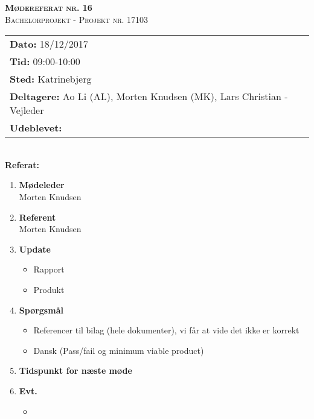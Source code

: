 
\newcommand{\HRule}{\rule{\linewidth}{0.1mm}}


	\begin{center}
		{\huge \bfseries \textsc{Mødereferat nr. 16}}\\
		\textsc{\large Bachelorprojekt - Projekt nr. 17103}\\[0.3cm]
	\end{center}
	\begin{tabular}{ll}
	\large \textbf{Dato:} 18/12/2017  	\\ %
	\large \textbf{Tid:}  09:00-10:00 	\\ %
	\large \textbf{Sted:} Katrinebjerg		\\ %
	\large \textbf{Deltagere:} Ao Li (AL), Morten Knudsen (MK), Lars Christian - Vejleder \\
	\large \textbf{Udeblevet:} 
	\end{tabular}\\
	\phantom{\,}\hspace{0.1em} \large \textbf{Referat:}
	\begin{enumerate}
		\itemsep 0.3em 
		\item \textbf{Mødeleder}\\
			Morten Knudsen
		\item \textbf{Referent}\\
			Morten Knudsen

		\item \textbf{Update}
			\begin{itemize}[-]
				\item Rapport 
				\item Produkt			
			\end{itemize}
		
							
		\item \textbf{Spørgsmål}
			\begin{itemize}[-]
				\item Referencer til bilag (hele dokumenter), vi får at vide det ikke er korrekt
				\item Dansk (Pass/fail og minimum viable product)
					
			\end{itemize}
	
		\item \textbf{Tidspunkt for næste møde} \\
			
						
		\item \textbf{Evt.}
			\begin{itemize}[-]
				\item 
			\end{itemize}
			
	\end{enumerate}
